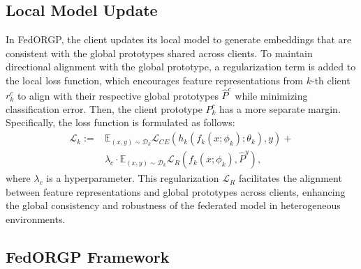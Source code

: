 \subsection{Local Model Update}
In FedORGP, the client updates its local model to generate embeddings that are consistent with the global prototypes shared across clients. To maintain directional alignment with the global prototype, a regularization term is added to the local loss function, which encourages feature representations from $k$-th client $r_k^c$ to align with their respective global prototypes $\hat{P}^c$ while minimizing classification error. Then, the client prototype $P_k^c$ has a more separate margin. Specifically, the loss function is formulated as follows:
\begin{equation}
\begin{split}
    \mathcal{L}_k:=
    &\mathbb{E}_{(x,y)\sim \mathcal{D}_k}\mathcal{L}_{CE}(h_k(f_k(x;\phi_k);\theta_k),y)+\\
    &\lambda_c \cdot \mathbb{E}_{(x,y)\sim \mathcal{D}_k}\mathcal{L}_R(f_k(x;\phi_k),\hat{P}^y),
\end{split}
\label{eq:client loss eqution}
\end{equation}
where $\lambda_c$ is a hyperparameter.
This regularization $\mathcal{L}_R$ facilitates the alignment between feature representations and global prototypes across clients, enhancing the global consistency and robustness of the federated model in heterogeneous environments.

\subsection{FedORGP Framework}

